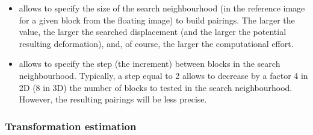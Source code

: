 \begin{itemize}
\item[]  allows to specify the size of the search neighbourhood (in the reference image for a given block from the floating image) to build pairings. The larger the value, the larger the searched displacement (and the larger the potential resulting deformation),  and, of course, the larger the computational effort.

\item[]  allows to specify the step (the increment) between blocks in the search neighbourhood. Typically, a step equal to 2 allows to decrease by a factor 4 in 2D (8 in 3D) the number of blocks to tested in the search neighbourhood. However, the resulting pairings will be less precise.

\end{itemize}



\subsubsection{Transformation estimation}
\label{sec:parameters:transformation:estimation}

